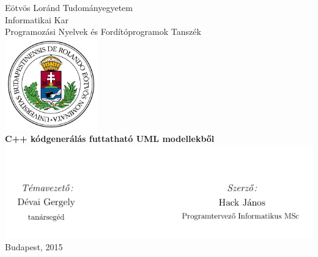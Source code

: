 \begin{titlepage}

\begin{center}

{\sc \LARGE Eötvös Loránd Tudományegyetem}\\[0.7cm]
{\sc \Large Informatikai Kar}\\[0.7cm]
{\sc \large Programozási Nyelvek és Fordítóprogramok Tanszék}\\[1cm]
\includegraphics[width=0.3\textwidth]{elte_cimer_szines}\\[1.0cm]


{\bf \huge C++ kódgenerálás futtatható UML modellekből}\\[0.5cm]

\includegraphics[width=1.1\textwidth]{cimlap.png}\\[1.0cm]

Budapest, 2015

\end{center}

\end{titlepage}